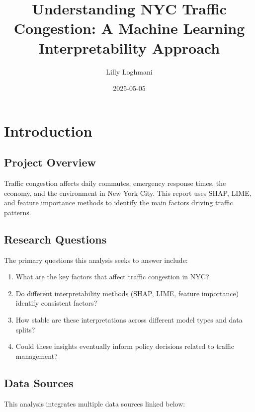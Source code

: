 \documentclass[
  letterpaper,
  DIV=11,
  numbers=noendperiod]{scrreprt}
\title{Understanding NYC Traffic Congestion: A Machine Learning
Interpretability Approach}
\author{Lilly Loghmani}
\date{2025-05-05}
\providecommand{\tightlist}{%
  \setlength{\itemsep}{0pt}\setlength{\parskip}{0pt}}\usepackage{longtable,booktabs,array}
\renewcommand*\contentsname{Table of contents}
\newcommand\contentsname{Table of contents}
\begin{document}
\maketitle

\renewcommand*\contentsname{Table of contents}
{
\hypersetup{linkcolor=}
\setcounter{tocdepth}{2}
\tableofcontents
}

\chapter{Introduction}\label{introduction}

\section{Project Overview}\label{project-overview}

Traffic congestion affects daily commutes, emergency response times, the
economy, and the environment in New York City. This report uses SHAP,
LIME, and feature importance methods to identify the main factors
driving traffic patterns.

\section{Research Questions}\label{research-questions}

The primary questions this analysis seeks to answer include:

\begin{enumerate}
\def\labelenumi{\arabic{enumi}.}
\tightlist
\item
  What are the key factors that affect traffic congestion in NYC?
\item
  Do different interpretability methods (SHAP, LIME, feature importance)
  identify consistent factors?
\item
  How stable are these interpretations across different model types and
  data splits?
\item
  Could these insights eventually inform policy decisions related to
  traffic management?
\end{enumerate}

\section{Data Sources}\label{data-sources}

This analysis integrates multiple data sources linked below:
\end{document}
